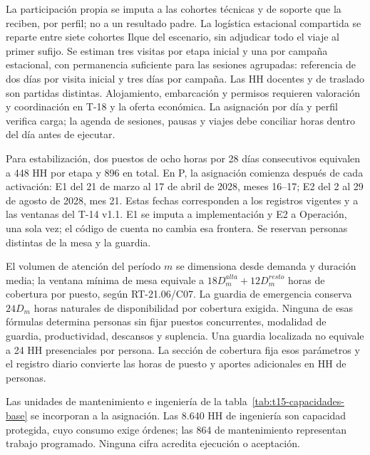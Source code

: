 La participación propia se imputa a las cohortes técnicas y de soporte que la reciben, por perfil; no a un resultado padre. La logística estacional compartida se reparte entre siete cohortes Ilque del escenario, sin adjudicar todo el viaje al primer sufijo. Se estiman tres visitas por etapa inicial y una por campaña estacional, con permanencia suficiente para las sesiones agrupadas: referencia de dos días por visita inicial y tres días por campaña. Las HH docentes y de traslado son partidas distintas. Alojamiento, embarcación y permisos requieren valoración y coordinación en T-18 y la oferta económica. La asignación por día y perfil verifica carga; la agenda de sesiones, pausas y viajes debe conciliar horas dentro del día antes de ejecutar.

Para estabilización, dos puestos de ocho horas por 28 días consecutivos equivalen a 448 HH por etapa y 896 en total. En P, la asignación comienza después de cada activación: E1 del 21 de marzo al 17 de abril de 2028, meses 16--17; E2 del 2 al 29 de agosto de 2028, mes 21. Estas fechas corresponden a los registros vigentes y a las ventanas del T-14 v1.1. E1 se imputa a implementación y E2 a Operación, una sola vez; el código de cuenta no cambia esa frontera. Se reservan personas distintas de la mesa y la guardia.

El volumen de atención del período $m$ se dimensiona desde demanda y duración media; la ventana mínima de mesa equivale a $18D_m^{alta}+12D_m^{resto}$ horas de cobertura por puesto, según RT-21.06/C07. La guardia de emergencia conserva $24D_m$ horas naturales de disponibilidad por cobertura exigida. Ninguna de esas fórmulas determina personas sin fijar puestos concurrentes, modalidad de guardia, productividad, descansos y suplencia. Una guardia localizada no equivale a 24 HH presenciales por persona. La sección de cobertura fija esos parámetros y el registro diario convierte las horas de puesto y aportes adicionales en HH de personas.

Las unidades de mantenimiento e ingeniería de la tabla~\ref{tab:t15-capacidades-base} se incorporan a la asignación. Las 8.640 HH de ingeniería son capacidad protegida, cuyo consumo exige órdenes; las 864 de mantenimiento representan trabajo programado. Ninguna cifra acredita ejecución o aceptación.

